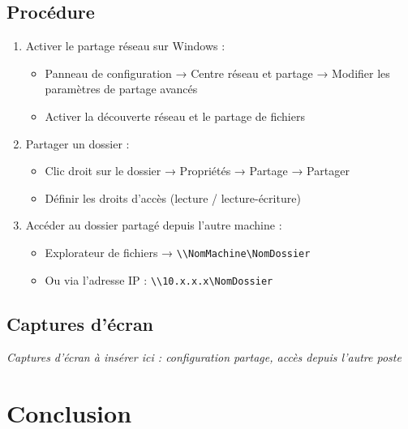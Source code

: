 \documentclass[a4paper,12pt]{article}
\begin{document}
\subsection{Procédure}

\begin{enumerate}
  \item Activer le partage réseau sur Windows :
  \begin{itemize}
    \item Panneau de configuration → Centre réseau et partage → Modifier les paramètres de partage avancés
    \item Activer la découverte réseau et le partage de fichiers
  \end{itemize}
  \item Partager un dossier :
  \begin{itemize}
    \item Clic droit sur le dossier → Propriétés → Partage → Partager
    \item Définir les droits d'accès (lecture / lecture-écriture)
  \end{itemize}
  \item Accéder au dossier partagé depuis l'autre machine :
  \begin{itemize}
    \item Explorateur de fichiers → \texttt{\textbackslash\textbackslash NomMachine\textbackslash NomDossier}
    \item Ou via l'adresse IP : \texttt{\textbackslash\textbackslash 10.x.x.x\textbackslash NomDossier}
  \end{itemize}
\end{enumerate}

\subsection{Captures d'écran}

\begin{infobox}
  \textit{Captures d'écran à insérer ici : configuration partage, accès depuis l'autre poste}
\end{infobox}

\section*{Conclusion}

\end{document}
